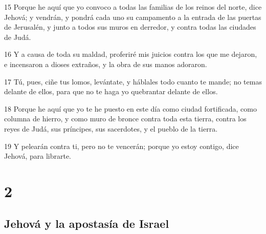 \par 15 Porque he aquí que yo convoco a todas las familias de los reinos del norte, dice Jehová; y vendrán, y pondrá cada uno su campamento a la entrada de las puertas de Jerusalén, y junto a todos sus muros en derredor, y contra todas las ciudades de Judá.
\par 16 Y a causa de toda su maldad, proferiré mis juicios contra los que me dejaron, e incensaron a dioses extraños, y la obra de sus manos adoraron.
\par 17 Tú, pues, ciñe tus lomos, levántate, y háblales todo cuanto te mande; no temas delante de ellos, para que no te haga yo quebrantar delante de ellos.
\par 18 Porque he aquí que yo te he puesto en este día como ciudad fortificada, como columna de hierro, y como muro de bronce contra toda esta tierra, contra los reyes de Judá, sus príncipes, sus sacerdotes, y el pueblo de la tierra.
\par 19 Y pelearán contra ti, pero no te vencerán; porque yo estoy contigo, dice Jehová, para librarte.

\chapter{2}

\section*{Jehová y la apostasía de Israel}

